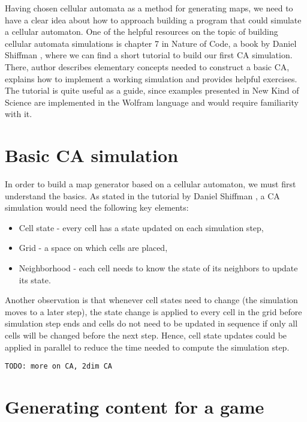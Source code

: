 \documentclass[12pt]{report}
\newcommand{\todo}[1]{}
\renewcommand{\todo}[1]{{\color{red} \par \noindent \footnotesize \texttt{TODO: {#1} }}}
\begin{document}
Having chosen cellular automata as a method for generating maps, we need to have a clear idea about how to approach building a program that could simulate a cellular automaton. One of the helpful resources on the topic of building cellular automata simulations is chapter 7 in Nature of Code, a book by Daniel Shiffman \autocite{shiffman2012nature}, where we can find a short tutorial to build our first CA simulation. There, author describes elementary concepts needed to construct a basic CA, explains how to implement a working simulation and provides helpful exercises. The tutorial is quite useful as a guide, since examples presented in New Kind of Science \autocite{wolfram2002new} are implemented in the Wolfram language and would require familiarity with it.

\section{Basic CA simulation}

In order to build a map generator based on a cellular automaton, we must first understand the basics. As stated in the tutorial by Daniel Shiffman \autocite{shiffman2012nature}, a CA simulation would need the following key elements:

\begin{itemize}
	\item Cell state - every cell has a state updated on each simulation step,
	\item Grid - a space on which cells are placed,
	\item Neighborhood - each cell needs to know the state of its neighbors to update its state.
\end{itemize}

Another observation is that whenever cell states need to change (the simulation moves to a later step), the state change is applied to every cell in the grid before simulation step ends and cells do not need to be updated in sequence if only all cells will be changed before the next step. Hence, cell state updates could be applied in parallel to reduce the time needed to compute the simulation step.

\todo{more on CA, 2dim CA}


 







\section{Generating content for a game}
\end{document}
